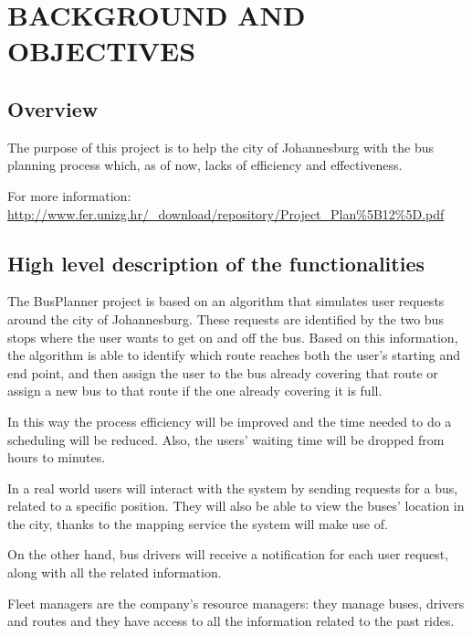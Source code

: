 \section{BACKGROUND AND OBJECTIVES}
\subsection{Overview} 
The purpose of this project is to help the city of Johannesburg with the bus planning process which, as of now, lacks of efficiency and effectiveness. 

For more information: \url{http://www.fer.unizg.hr/_download/repository/Project_Plan\%5B12\%5D.pdf}

\subsection{High level description of the functionalities}
The BusPlanner project is based on an algorithm that simulates user requests around the city of Johannesburg. These requests are identified by the two bus stops where the user wants to get on and off the bus. Based on this information, the algorithm is able to identify which route reaches both the user's starting and end point, and then assign the user to the bus already covering that route or assign a new bus to that route if the one already covering it is full. 

In this way the process efficiency will be improved and the time needed to do a scheduling will be reduced. Also, the users' waiting time will be dropped from hours to minutes. 

In a real world users will interact with the system by sending requests for a bus, related to a specific position. They will also be able to view the buses' location in the city, thanks to the mapping service the system will make use of. 

On the other hand, bus drivers will receive a notification for each user request, along with all the related information. 

Fleet managers are the company's resource managers: they manage buses, drivers and routes and they have access to all the information related to the past rides.